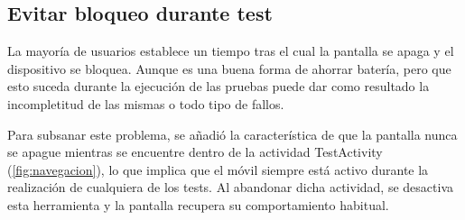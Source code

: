 \subsection{Evitar bloqueo durante test}
La mayoría de usuarios establece un tiempo tras el cual la pantalla se apaga y el dispositivo se bloquea. Aunque es una buena forma de ahorrar batería, pero que esto suceda durante la ejecución de las pruebas puede dar como resultado la incompletitud de las mismas o todo tipo de fallos.

Para subsanar este problema, se añadió la característica de que la pantalla nunca se apague mientras se encuentre dentro de la actividad TestActivity (\ref{fig:navegacion}), lo que implica que el móvil siempre está activo durante la realización de cualquiera de los tests. Al abandonar dicha actividad, se desactiva esta herramienta y la pantalla recupera su comportamiento habitual.

